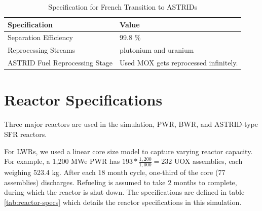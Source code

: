 \begin{table}[h]
    \centering
    \begin{tabularx}{\textwidth}{bb}
        \hline
        \textbf{Specification }& \textbf{Value} \\
        \hline
        Separation Efficiency & 99.8 \% \\
        Reprocessing Streams & plutonium and uranium \\
        \gls{ASTRID} Fuel Reprocessing Stage &  Used \gls{MOX} gets reprocessed infinitely. \\
        \hline
    \end{tabularx}
    \caption {Specification for French Transition to \glspl{ASTRID} }
    \label{tab:sim_france}
\end{table}

\pagebreak

\section{Reactor Specifications}
Three major reactors are used in the simulation, \gls{PWR}, \gls{BWR}, and ASTRID-type \gls{SFR} reactors.


For \glspl{LWR}, we used a linear core size model to capture
varying reactor capacity. For example, a 
1,200 \gls{MWe} PWR has $193*\frac{1,200}{1,000} = 232$ \gls{UOX} assemblies, each
weighing 523.4 kg.
After each 18 month cycle, one-third of the 
core (77 assemblies) discharges. Refueling
is assumed to take 2 months to complete, during which the reactor
is shut down. The specifications are defined in 
table \ref{tab:reactor-specs} which details the reactor specifications in this simulation.

